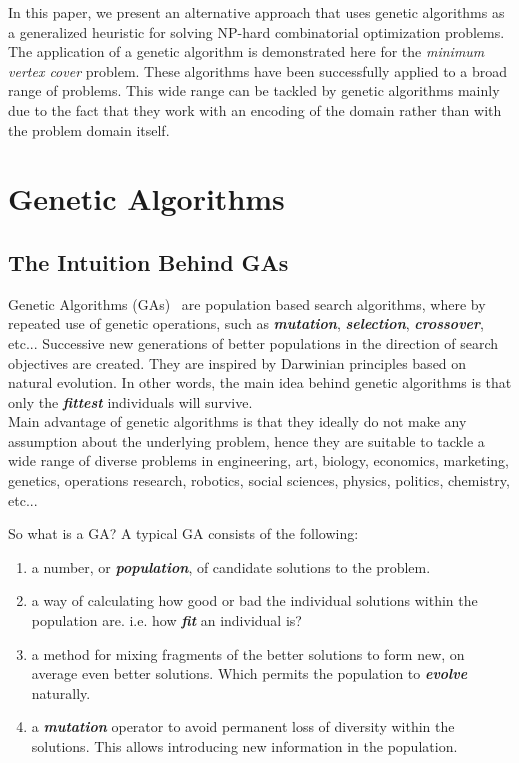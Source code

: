 \documentclass[12pt]{article}
\newcommand{\textem}[1]{\textbf{\textit{#1}}}
\begin{document}
In this paper, we present an alternative approach that
uses genetic algorithms as a generalized heuristic for solving NP-hard combinatorial optimization problems. The
application of a genetic algorithm is demonstrated here for
the \textit{minimum vertex cover} problem. These algorithms
have been successfully applied to a broad range of problems. This wide range can be tackled by genetic algorithms
mainly due to the fact that they work with an encoding of
the domain rather than with the problem domain itself.


\section{Genetic Algorithms}
\subsection{The Intuition Behind GAs}
Genetic Algorithms (GAs)~\cite{goldberg1989genetic} are population based
search algorithms, where by repeated use of genetic operations,
such as \textem{mutation}, \textem{selection}, \textem{crossover}, etc...
Successive new generations of better populations in the direction of
search objectives are created. They are inspired by Darwinian principles
based on natural evolution. In other words, the main idea behind genetic
algorithms is that only the \textem{fittest} individuals will survive.\\
Main advantage of genetic algorithms is that they ideally do not make
any assumption about the underlying problem, hence they are suitable to tackle
a wide range of diverse problems in
engineering, art, biology, economics, marketing, genetics,
operations research, robotics, social sciences, physics, politics, chemistry,
etc...

\noindent
So what is a GA? A typical GA consists of the following:
\vspace{-5mm}
\begin{enumerate}
\setlength{\parskip}{0em}
\item a number, or \textem{population}, of candidate solutions to the problem.
\item a way of calculating how good or bad the individual solutions within the
population are. i.e. how \textem{fit} an individual is?
\item a method for mixing fragments of the better solutions to form new, on
average even better solutions. Which permits the population to \textem{evolve} naturally.
\item a \textem{mutation} operator to avoid permanent loss of diversity within the
solutions. This allows introducing new information in the population.
\end{enumerate}
\end{document}
